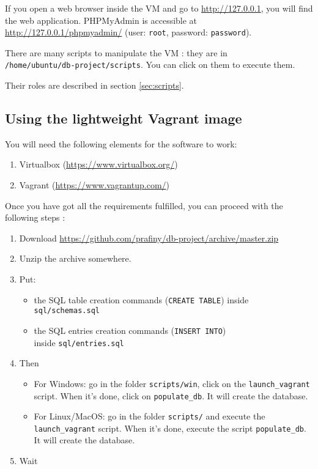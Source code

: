 \documentclass[twoside,a4paper,12pt]{article}
\begin{document}
If you open a web browser inside the VM and go to \url{http://127.0.0.1}, you will find the web application. PHPMyAdmin is accessible at \url{http://127.0.0.1/phpmyadmin/} (user: \texttt{root}, password: \texttt{password}).

There are many scripts to manipulate the VM : they are in\\ \texttt{/home/ubuntu/db-project/scripts}. You can click on them to execute them.

Their roles are described in section \ref{sec:scripts}. 

\newpage
\subsection{Using the lightweight Vagrant image}
You will need the following elements for the software to work:
\begin{enumerate}
\item Virtualbox (\url{https://www.virtualbox.org/})
\item Vagrant (\url{https://www.vagrantup.com/})
\end{enumerate}

Once you have got all the requirements fulfilled, you can proceed with the following steps :

\begin{enumerate}
\item Download \url{https://github.com/prafiny/db-project/archive/master.zip}
\item Unzip the archive somewhere.
\item Put:
\begin{itemize}
	\item the SQL table creation commands (\texttt{CREATE TABLE}) inside \texttt{sql/schemas.sql}
	\item the SQL entries creation commands (\texttt{INSERT INTO})\\ inside \texttt{sql/entries.sql}
\end{itemize}
\item Then
\begin{itemize}
	\item For Windows: go in the folder \texttt{scripts/win}, click on the \texttt{launch\_vagrant} script. When it's done, click on \texttt{populate\_db}. It will create the database.
	\item For Linux/MacOS: go in the folder \texttt{scripts/} and execute the \texttt{launch\_vagrant} script. When it's done, execute the script \texttt{populate\_db}. It will create the database.
\end{itemize}
\item Wait
\end{enumerate}
\end{document}
